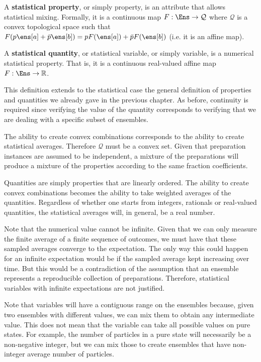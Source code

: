 \begin{mathSection}
	
\begin{defn}
	A \textbf{statistical property}, or simply property, is an attribute that allows statistical mixing. Formally, it is a continuous map $F : \Ens \to \mathcal{Q}$ where $\mathcal{Q}$ is a convex topological space such that $F(p \ens[a] + \bar{p} \ens[b]) = p F(\ens[a]) + \bar{p} F(\ens[b])$ (i.e. it is an affine map).
	
	A \textbf{statistical quantity}, or statistical variable, or simply variable, is a numerical statistical property. That is, it is a continuous real-valued affine map $F : \Ens \to \mathbb{R}$.
\end{defn}

\begin{justification}
	This definition extends to the statistical case the general definition of properties and quantities we already gave in the previous chapter. As before, continuity is required since verifying the value of the quantity corresponds to verifying that we are dealing with a specific subset of ensembles.
	
	The ability to create convex combinations corresponds to the ability to create statistical averages. Therefore $\mathcal{Q}$ must be a convex set. Given that preparation instances are assumed to be independent, a mixture of the preparations will produce a mixture of the properties according to the same fraction coefficients.
	
	Quantities are simply properties that are linearly ordered. The ability to create convex combinations becomes the ability to take weighted averages of the quantities. Regardless of whether one starts from integers, rationals or real-valued quantities, the statistical averages will, in general, be a real number.
	
	Note that the numerical value cannot be infinite. Given that we can only measure the finite average of a finite sequence of outcomes, we must have that these sampled averages converge to the expectation. The only way this could happen for an infinite expectation would be if the sampled average kept increasing over time. But this would be a contradiction of the assumption that an ensemble represents a reproducible collection of preparations. Therefore, statistical variables with infinite expectations are not justified.
\end{justification}

\begin{remark}
	Note that variables will have a contiguous range on the ensembles because, given two ensembles with different values, we can mix them to obtain any intermediate value. This does not mean that the variable can take all possible values on pure states. For example, the number of particles in a pure state will necessarily be a non-negative integer, but we can mix those to create ensembles that have non-integer average number of particles.
\end{remark}


\end{mathSection}
